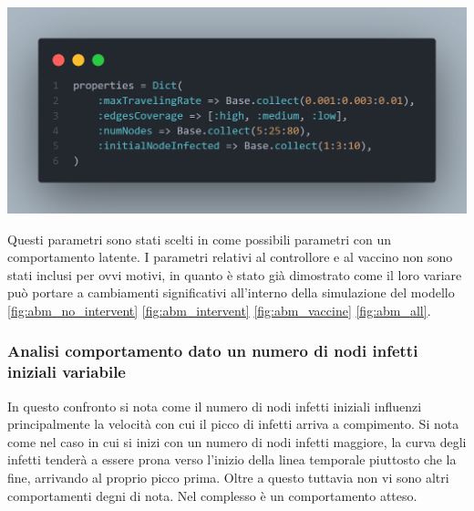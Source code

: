\begin{minipage}{\linewidth}
	\centering
	\includegraphics[width=\textwidth]{img/paramscan.png}
	\label{fig:paramscan}
\end{minipage}

Questi parametri sono stati scelti in come possibili parametri con un comportamento latente. I parametri 
relativi al controllore e al vaccino non sono stati inclusi per ovvi motivi, in quanto è stato già dimostrato 
come il loro variare può portare a cambiamenti significativi all'interno della simulazione del modello 
\ref{fig:abm_no_intervent} \ref{fig:abm_intervent} \ref{fig:abm_vaccine} \ref{fig:abm_all}.
\newpage

\subsubsection{Analisi comportamento dato un numero di nodi infetti iniziali variabile}
In questo confronto si nota come il numero di nodi infetti iniziali influenzi principalmente la velocità con cui 
il picco di infetti arriva a compimento. Si nota come nel caso in cui si inizi con un numero di nodi infetti maggiore, 
la curva degli infetti tenderà a essere prona verso l'inizio della linea temporale piuttosto che la fine, arrivando 
al proprio picco prima. Oltre a questo tuttavia non vi sono altri comportamenti degni di nota. Nel complesso è un
comportamento atteso.

